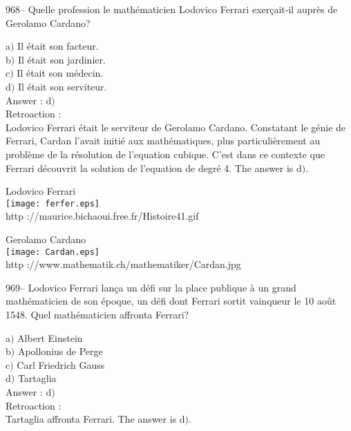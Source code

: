 ﻿\documentclass[letterpaper, 12pt]{article}
\begin{document}
968-- Quelle profession le math\'ematicien Lodovico Ferrari exer\c
cait-il aupr\`es de Gerolamo Cardano?

a$)$ Il \'etait son facteur. \\
b$)$ Il \'etait son jardinier.  \\
c$)$ Il \'etait son m\'edecin. \\
d$)$ Il \'etait son serviteur. \\

Answer : d$)$\\

Retroaction : \\
Lodovico Ferrari \'etait le serviteur de Gerolamo Cardano.
Constatant le g\'enie de Ferrari, Cardan l'avait initi\'e aux
math\'emati\-ques, plus particuli\`erement au probl\`eme de la
r\'esolution de l'equation
cubique. C'est dans ce contexte que Ferrari d\'ecouvrit la solution de
l'equation de degr\'e 4. The answer is d$)$.\\

        \begin{center}
        Lodovico Ferrari\\
    \texttt{[image: ferfer.eps]}\\
        {\footnotesize http ://maurice.bichaoui.free.fr/Histoire41.gif}
    \end{center}

        \begin{center}
        Gerolamo Cardano\\
    \texttt{[image: Cardan.eps]}\\
        {\footnotesize http ://www.mathematik.ch/mathematiker/Cardan.jpg}
    \end{center}

969-- Lodovico Ferrari lan\c ca un d\'efi sur la place publique \`a
un grand math\'ematicien de son \'epoque, un d\'efi dont Ferrari
sortit vainqueur le 10 ao\^ut 1548. Quel math\'ematicien affronta
Ferrari?

a$)$ Albert Einstein \\
b$)$ Apollonius de Perge  \\
c$)$ Carl Friedrich Gauss \\
d$)$ Tartaglia\\

Answer : d$)$\\

Retroaction :\\
Tartaglia affronta Ferrari. The answer is d$)$.\\
\end{document}

